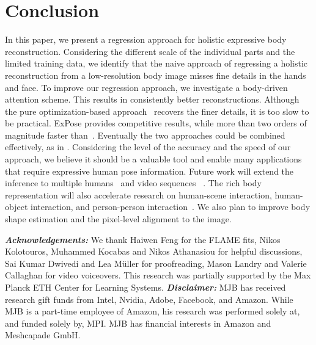 \documentclass[runningheads]{llncs}
\newcommand{\modelname}{\mbox{ExPose}\xspace}
\newcommand{\flame}{\mbox{FLAME}\xspace}
\begin{document}
 \section{Conclusion}
\label{sec:conclusion}

In this paper, we present a regression approach for holistic expressive body reconstruction.
Considering the different scale of the individual parts and the limited training data,
we identify that the naive approach of regressing a holistic
reconstruction from a low-resolution body image misses fine details in
the hands and face.
To improve our regression approach, we investigate a body-driven attention
scheme.
This results in consistently better reconstructions.
Although the pure optimization-based
approach~\cite{Pavlakos_2019_CVPR}  recovers the finer details, it is
too slow to be practical.
\modelname provides competitive results, while more than two orders of magnitude faster than~\cite{Pavlakos_2019_CVPR}.
Eventually the two approaches could be combined effectively, as in \cite{Kolotouros_2019_ICCV}.
Considering the level of the accuracy and the speed of our approach,
we believe it should be a valuable tool and enable many applications
that require expressive human pose information. Future work will
extend the inference to multiple
humans~\cite{Jiang_2020_CVPR,zanfir_2018_cvpr,zanfir_nips_2018} and
video sequences ~\cite{kanazawa_2019_cvpr,Kocabas_2020_CVPR}.
The rich body representation will also accelerate research on
human-scene \cite{PROX:2019,savva2016pigraphs} interaction,
human-object \cite{Laptvev_CVPR_2019_forces,GRAB:2020} interaction,
and person-person
interaction~\cite{Fieraru_2020_CVPR,li_2020_interactingHumans}.
We also plan to improve body shape estimation and the pixel-level alignment to the image.
 
{
\smallskip
\noindent
\footnotesize
\textbf{\emph{Acknowledgements:}}
We thank Haiwen Feng for the \flame fits,
Nikos Kolotouros, Muhammed Kocabas and Nikos Athanasiou for helpful discussions,
Sai Kumar Dwivedi and Lea M{\"u}ller for proofreading,
Mason Landry and Valerie Callaghan for video voiceovers.
This research was partially supported by the Max Planck ETH Center for Learning Systems.
\textbf{\emph{Disclaimer:}}
MJB has received research gift funds from Intel, Nvidia, Adobe, Facebook, and Amazon.
While MJB is a part-time employee of Amazon, his research was performed solely at, and funded solely by, MPI.
MJB has financial interests in Amazon and Meshcapade GmbH.
}
 
\clearpage




\end{document}
